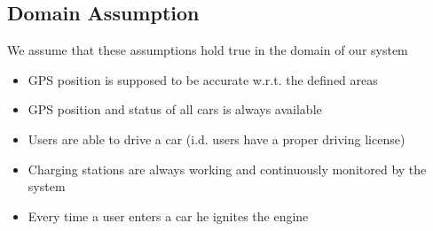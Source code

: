 \subsection{Domain Assumption}
	We assume that these assumptions hold true in the domain of our system 
	\begin{itemize}
		\item GPS position is supposed to be accurate w.r.t. the defined areas
		\item GPS position and status of all cars is always available
		\item Users are able to drive a car (i.d. users have a proper driving license)
		\item Charging stations are always working and continuously monitored by the system
		\item Every time a user enters a car he ignites the engine
	\end{itemize}